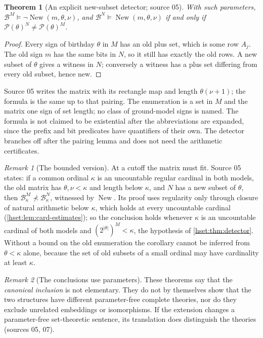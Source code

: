 \documentclass[11pt,letterpaper]{article}
\newtheorem{theorem}{Theorem}[section]
\theoremstyle{definition}
\theoremstyle{remark}
\newtheorem{remark}[remark]{Remark}\aliascntresetthe{remark}
\newcommand{\B}{\mathcal B}
\newcommand{\New}{\operatorname{New}}
\newcommand{\Pow}{\mathcal P}
\newcommand{\card}[1]{\lvert#1\rvert}
\begin{document}
\begin{theorem}[An explicit new-subset detector; source 05]\label{hset:thm:new}
With such parameters, $\B^M\models\neg\New(m,\theta,\nu)$, and
$\B^N\models\New(m,\theta,\nu)$ if and only if $\Pow(\theta)^N\ne\Pow(\theta)^M$.
\end{theorem}
\begin{proof}
Every sign of birthday $\theta$ in $M$ has an old plus set, which is some row
$A_j$. The old sign $m$ has the same bits in $N$, so it still has exactly the
old rows. A new subset of $\theta$ gives a witness in $N$; conversely a witness
has a plus set differing from every old subset, hence new.
\end{proof}

Source 05 writes the matrix with its rectangle map and length $\theta(\nu+1)$;
the formula is the same up to that pairing. The enumeration is a set in $M$ and
the matrix one sign of set length; no class of ground-model signs is named. The
formula is not claimed to be existential after the abbreviations are expanded,
since the prefix and bit predicates have quantifiers of their own. The
detector branches off after the pairing lemma and does not need the arithmetic
certificates.

\begin{remark}[The bounded version]\label{hset:rem:bounded-new}
At a cutoff the matrix must fit. Source 05 states: if a common ordinal $\kappa$
is an uncountable regular cardinal in both models, the old matrix has
$\theta,\nu<\kappa$ and length below $\kappa$, and $N$ has a new subset of
$\theta$, then $\B^M_\kappa\not\prec\B^N_\kappa$, witnessed by $\New$. Its proof
uses regularity only through closure of natural arithmetic below $\kappa$, which
holds at every uncountable cardinal (\cref{hset:lem:card-estimates}); so the
conclusion holds whenever $\kappa$ is an uncountable cardinal of both models and
$(2^{\card\theta})^M<\kappa$, the hypothesis of \cref{hset:thm:detector}.
Without a bound on the old enumeration the corollary cannot be inferred from
$\theta<\kappa$ alone, because the set of old subsets of a small ordinal may
have cardinality at least $\kappa$.
\end{remark}

\begin{remark}[The conclusions use parameters]
These theorems say that the \emph{canonical inclusion} is not elementary. They
do not by themselves show that the two structures have different
parameter-free complete theories, nor do they exclude unrelated embeddings or
isomorphisms. If the extension changes a parameter-free set-theoretic sentence,
its translation does distinguish the theories (sources 05, 07).
\end{remark}
\end{document}
